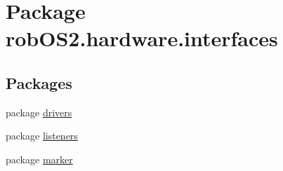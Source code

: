 \hypertarget{namespacerob_o_s2_1_1hardware_1_1interfaces}{
\section{Package robOS2.hardware.interfaces}
\label{namespacerob_o_s2_1_1hardware_1_1interfaces}
}
\subsection*{Packages}
\begin{DoxyCompactItemize}
\item 
package \hyperlink{namespacerob_o_s2_1_1hardware_1_1interfaces_1_1drivers}{drivers}
\item 
package \hyperlink{namespacerob_o_s2_1_1hardware_1_1interfaces_1_1listeners}{listeners}
\item 
package \hyperlink{namespacerob_o_s2_1_1hardware_1_1interfaces_1_1marker}{marker}
\end{DoxyCompactItemize}
